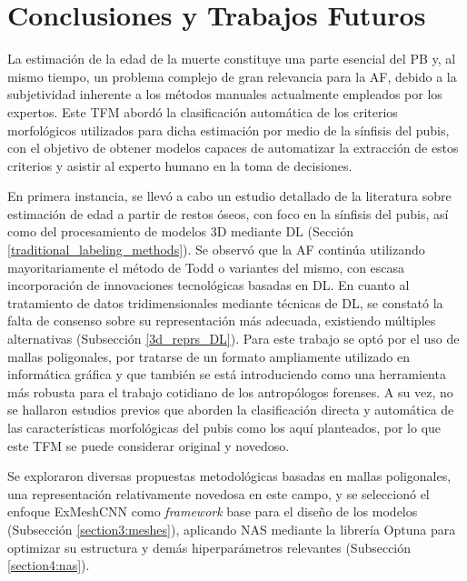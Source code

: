 \chapter{Conclusiones y Trabajos Futuros}

La estimación de la edad de la muerte constituye una parte esencial del PB y, al mismo tiempo, un problema complejo de gran relevancia para la AF, debido a la subjetividad inherente a los métodos manuales actualmente empleados por los expertos. Este TFM abordó la clasificación automática de los criterios morfológicos utilizados para dicha estimación por medio de la sínfisis del pubis, con el objetivo de obtener modelos capaces de automatizar la extracción de estos criterios y asistir al experto humano en la toma de decisiones.

En primera instancia, se llevó a cabo un estudio detallado de la literatura sobre estimación de edad a partir de restos óseos, con foco en la sínfisis del pubis, así como del procesamiento de modelos 3D mediante DL (Sección \ref{traditional_labeling_methods}). Se observó que la AF continúa utilizando mayoritariamente el método de Todd \cite{RefWorks:RefID:19-todd1921age} o variantes del mismo, con escasa incorporación de innovaciones tecnológicas basadas en DL. En cuanto al tratamiento de datos tridimensionales mediante técnicas de DL, se constató la falta de consenso sobre su representación más adecuada, existiendo múltiples alternativas (Subsección \ref{3d_reprs_DL}). Para este trabajo se optó por el uso de mallas poligonales, por tratarse de un formato ampliamente utilizado en informática gráfica y que también se está introduciendo como una herramienta más robusta para el trabajo cotidiano de los antropólogos forenses. A su vez, no se hallaron estudios previos que aborden la clasificación directa y automática de las características morfológicas del pubis como los aquí planteados, por lo que este TFM se puede considerar original y novedoso.

Se exploraron diversas propuestas metodológicas basadas en mallas poligonales, una representación relativamente novedosa en este campo, y se seleccionó el enfoque ExMeshCNN \cite{kim_exmeshcnn_2022} como \textit{framework} base para el diseño de los modelos (Subsección \ref{section3:meshes}), aplicando NAS mediante la librería Optuna \cite{optuna_2019} para optimizar su estructura y demás hiperparámetros relevantes (Subsección \ref{section4:nas}).

